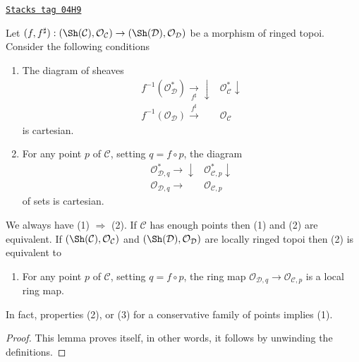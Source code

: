 \begin{lemma}
\label{sites-modules-lemma-locally-ringed-morphism}
\href{https://stacks.math.columbia.edu/tag/04H9}{\texttt{Stacks tag 04H9}}

Let
$(f, f^\sharp) : (\Sh(\mathcal{C}), \mathcal{O}_\mathcal{C})
\to (\Sh(\mathcal{D}), \mathcal{O}_\mathcal{D})$
be a morphism of ringed topoi.
Consider the following conditions
\begin{enumerate}
\item The diagram of sheaves
$$
\begin{array}{cc}f^{-1}(\mathcal{O}^*_\mathcal{D}) \underset{f^\sharp}{\longrightarrow}\downarrow & \mathcal{O}^*_\mathcal{C} \downarrow \\ f^{-1}(\mathcal{O}_\mathcal{D}) \overset{f^\sharp}{\longrightarrow} & \mathcal{O}_\mathcal{C}\end{array}
$$
is cartesian.
\item For any point $p$ of $\mathcal{C}$, setting $q = f \circ p$,
the diagram
$$
\begin{array}{cc}\mathcal{O}^*_{\mathcal{D}, q} \longrightarrow\downarrow & \mathcal{O}^*_{\mathcal{C}, p} \downarrow \\ \mathcal{O}_{\mathcal{D}, q} \longrightarrow & \mathcal{O}_{\mathcal{C}, p}\end{array}
$$
of sets is cartesian.
\end{enumerate}
We always have (1) $\Rightarrow$ (2). If $\mathcal{C}$ has enough points
then (1) and (2) are equivalent. If
$(\Sh(\mathcal{C}), \mathcal{O}_\mathcal{C})$
and
$(\Sh(\mathcal{D}), \mathcal{O}_\mathcal{D})$
are locally ringed topoi then (2) is equivalent to
\begin{enumerate}
\item[(3)] For any point $p$ of $\mathcal{C}$, setting $q = f \circ p$,
the ring map $\mathcal{O}_{\mathcal{D}, q} \to \mathcal{O}_{\mathcal{C}, p}$
is a local ring map.
\end{enumerate}
In fact, properties (2), or (3) for a conservative
family of points implies (1).
\end{lemma}

\begin{proof}
This lemma proves itself, in other words, it follows by unwinding the
definitions.
\end{proof}

